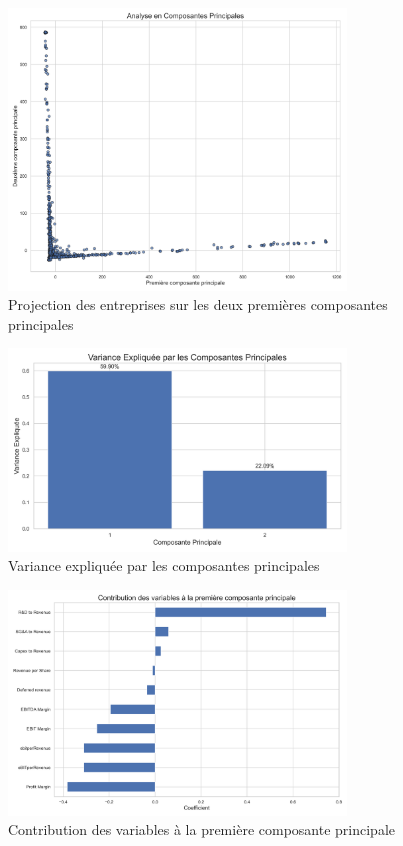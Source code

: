 \documentclass[11pt]{report}
\begin{document}
\begin{figure}[H]
    \centering
    \includegraphics[width=0.8\textwidth]{figures/pca_analysis.png}
    \caption{Projection des entreprises sur les deux premières composantes principales}
    \label{fig:pca_projection}
\end{figure}

\begin{figure}[H]
    \centering
    \includegraphics[width=0.8\textwidth]{figures/pca_explained_variance.png}
    \caption{Variance expliquée par les composantes principales}
    \label{fig:pca_variance}
\end{figure}

\begin{figure}[H]
    \centering
    \includegraphics[width=0.8\textwidth]{figures/pca_loadings_pc1.png}
    \caption{Contribution des variables à la première composante principale}
    \label{fig:pca_loadings}
\end{figure}
\end{document}
